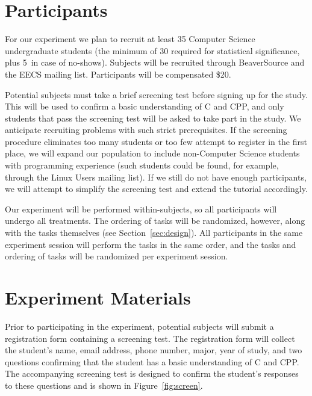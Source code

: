 \documentclass[11pt]{article}
\begin{document}
\section{Participants}
\label{sec:participants}

For our experiment we plan to recruit at least 35 Computer Science
undergraduate students (the minimum of 30 required for statistical
significance, plus 5\ in case of no-shows).  Subjects will be recruited through
BeaverSource and the EECS mailing list.  Participants will be compensated \$20.

Potential subjects must take a brief screening test before signing up for the
study.  This will be used to confirm a basic understanding of C and CPP, and
only students that pass the screening test will be asked to take part in the
study.
%
We anticipate recruiting problems with such strict prerequisites.  If the
screening procedure eliminates too many students or too few attempt to register
in the first place, we will expand our population to include non-Computer
Science students with programming experience (such students could be found, for
example, through the Linux Users mailing list).  If we still do not have enough
participants, we will attempt to simplify the screening test and extend the
tutorial accordingly.

Our experiment will be performed within-subjects, so all participants will
undergo all treatments.  The ordering of tasks will be randomized, however,
along with the tasks themselves (see Section~\ref{sec:design}).  All
participants in the same experiment session will perform the tasks in the same
order, and the tasks and ordering of tasks will be randomized per experiment session.


\section{Experiment Materials}
\label{sec:materials}

Prior to participating in the experiment, potential subjects will submit a
registration form containing a screening test.  The registration form will
collect the student's name, email address, phone number, major, year of study,
and two questions confirming that the student has a basic understanding of C
and CPP.  The accompanying screening test is designed to confirm the student's
responses to these questions and is shown in Figure~\ref{fig:screen}.
\end{document}
